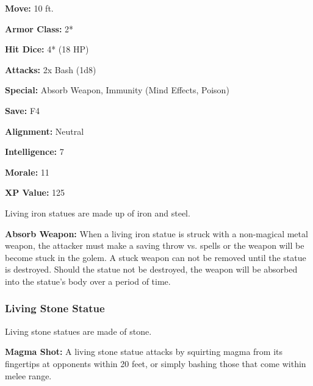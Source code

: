 \begin{multicols*}{2}
{\textbf{Move:} 10 ft.

\textbf{Armor Class:} 2*

\textbf{Hit Dice:} 4* (18 HP)

\textbf{Attacks:} 2x Bash (1d8)

\textbf{Special:} Absorb Weapon, Immunity (Mind Effects, Poison)

\textbf{Save:} F4

\textbf{Alignment:} Neutral

\textbf{Intelligence:} 7

\textbf{Morale:} 11

\textbf{XP Value:} 125}

Living iron statues are made up of iron and steel.

\textbf{Absorb Weapon:} When a living iron statue is struck with a non-magical metal weapon, the attacker must make a saving throw vs. spells or the weapon will be become stuck in the golem. A stuck weapon can not be removed until the statue is destroyed. Should the statue not be destroyed, the weapon will be absorbed into the statue’s body over a period of time.

\subsubsection{Living Stone Statue}

Living stone statues are made of stone.

\textbf{Magma Shot:} A living stone statue attacks by squirting magma from its fingertips at opponents within 20 feet, or simply bashing those that come within melee range.


\end{multicols*}

